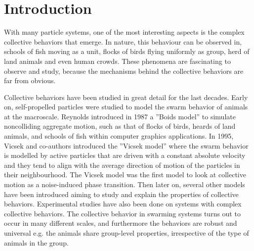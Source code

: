\chapter{Introduction} 

With many particle systems, one of the most interesting aspects is the complex 
collective behaviors that emerge. In nature, this behaviour can be observed in, 
schools of fish moving as a unit, flocks of birds flying uniformly as group, 
herd of land animals and even human crowds. These phenomena are fascinating 
to observe and study, because the mechanisms behind the collective behaviors are 
far from obvious.

Collective behaviors have been studied in great detail for the last decades. 
Early on, self-propelled particles were studied to model the swarm behavior of 
animals at the macroscale\cite{bechinger2016active}. Reynolds introduced in 1987 
a ''Boids model'' to simulate noncolliding aggregate motion, such as that of 
flocks of birds, heards of land animals, and schools of fish within computer 
graphics applications\cite{reynolds1987flocks}. In 1995, Vicsek and co-authors 
introduced the ''Vicsek model'' where the swarm behavior is modelled by active 
particles that are driven with a constant absolute velocity and they tend to 
align with the average direction of motion of the particles in their 
neighbourhood\cite{vicsek1995novel}. The Vicsek model was the first model to 
look at collective motion as a noise-induced phase transition. Then later on, 
several other models have been introduced aiming to study and explain the 
properties of collective behaviors\cite{chate2008modeling,grossmann2013self,
barberis2016large,mijalkov2016engineering, volpe2016effective,matsui2017noise,
cambui2017finite}. Experimental studies have also been done on systems with 
complex collective behaviors\cite{czirok1996formation, palacci2013living, 
theurkauff2012dynamic, ginot2015nonequilibrium, morin2017distortion}.
The collective behavior in swarming systems turns out to occur in many 
different scales, and furthermore the behaviors are robust and universal 
e.g. the animals share group-level properties, irrespective of the type of 
animals in the group\cite{buhl2006disorder}.

